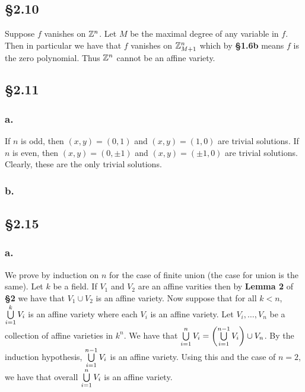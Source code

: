 \documentclass[letterpaper]{article}
\begin{document}
\subsection*{\S 2.10}

Suppose $f$ vanishes on $\mathbb{Z}^{n}$.
Let $M$ be the maximal degree of any variable in $f$.
Then in particular we have that $f$ vanishes on $\mathbb{Z}_{M + 1}^{n}$ which by \textbf{\S 1.6b} means $f$ is the zero polynomial.
Thus $\mathbb{Z}^{n}$ cannot be an affine variety.

\subsection*{\S 2.11}

\subsubsection*{a.}

If $n$ is odd, then $(x, y) = (0, 1)$ and $(x, y) = (1, 0)$ are trivial solutions.
If $n$ is even, then $(x, y) = (0, \pm 1)$ and $(x, y) = (\pm 1, 0)$ are trivial solutions.
Clearly, these are the only trivial solutions.

\subsubsection*{b.}


\subsection*{\S 2.15}

\subsubsection*{a.}

We prove by induction on $n$ for the case of finite union (the case for union is the same).
Let $k$ be a field.
If $V_{1}$ and $V_{2}$ are an affine varities then by \textbf{Lemma 2} of \textbf{\S 2} we have that $V_{1} \cup V_{2}$ is an affine variety.
Now suppose that for all $k < n$, $\bigcup\limits_{i = 1}^{k} V_{i}$ is an affine variety where each $V_{i}$ is an affine variety.
Let $V_{i}, \ldots, V_{n}$ be a collection of affine varieties in $k^{n}$.
We have that $\Bigcup_{i = 1}^{n} V_{i} = \pqty{\Bigcup_{i = 1}^{n - 1} V_{i}} \cup V_{n}$.
By the induction hypothesis, $\bigcup\limits_{i = 1}^{n - 1} V_{i}$ is an affine variety.
Using this and the case of $n = 2$, we have that overall $\bigcup\limits_{i = 1}^{n} V_{i}$ is an affine variety.
\end{document}
